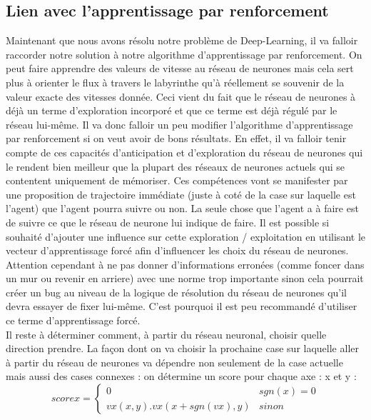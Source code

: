 \documentclass[10pt]{article}
\begin{document}
\subsection{Lien avec l'apprentissage par renforcement}
Maintenant que nous avons résolu notre problème de Deep-Learning, il va falloir raccorder notre solution à notre algorithme d'apprentissage par renforcement. On peut faire apprendre des valeurs de vitesse au réseau de neurones mais cela sert plus à orienter le flux à travers le labyrinthe qu'à réellement se souvenir de la valeur exacte des vitesses donnée. Ceci vient du fait que le réseau de neurones à déjà un terme d'exploration incorporé et que ce terme est déjà régulé par le réseau lui-même. Il va donc falloir un peu modifier l'algorithme d'apprentissage par renforcement si on veut avoir de bons résultats. En effet, il va falloir tenir compte de ces capacités d'anticipation et d'exploration du réseau de neurones qui le rendent bien meilleur que la plupart des réseaux de neurones actuels qui se contentent uniquement de mémoriser. Ces compétences vont se manifester par une proposition de trajectoire immédiate (juste à coté de la case sur laquelle est l'agent) que l'agent pourra suivre ou non. La seule chose que l'agent a à faire est de suivre ce que le réseau de neurone lui indique de faire. Il est possible si souhaité d'ajouter une influence sur cette exploration / exploitation en utilisant le vecteur d'apprentissage forcé afin d'influencer les choix du réseau de neurones. Attention cependant à ne pas donner d'informations erronées (comme foncer dans un mur ou revenir en arriere) avec une norme trop importante sinon cela pourrait créer un bug au niveau de la logique de résolution du réseau de neurones qu'il devra essayer de fixer lui-même. C'est pourquoi il est peu recommandé d'utiliser ce terme d'apprentissage forcé.\\
Il reste à déterminer comment, à partir du réseau neuronal, choisir quelle direction prendre. La façon dont on va choisir la prochaine case sur laquelle aller à partir du réseau de neurones va dépendre non seulement de la case actuelle mais aussi des cases connexes : on détermine un score pour chaque axe : x et y :
\[scorex = 
\begin{cases}
	0 & sgn(x) = 0 \\
	vx(x,y).vx(x+sgn(vx),y) & sinon
\end{cases}
\]
\end{document}
